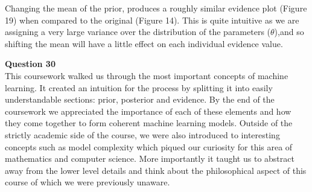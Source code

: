 \documentclass[10pt, a4paper, twocolumn]{article} %
\begin{document}
\begin{enumerate}
  Changing the mean of the prior, produces a roughly similar evidence plot (Figure 19) when compared to the original (Figure 14). This is quite intuitive as we are assigning a very large variance over the distribution of the parameters ($\theta$),and so shifting the mean will have a little effect on each individual evidence value.
  
  \textbf{Question 30}\\ This coursework walked us through the most important concepts of machine learning. It created an intuition for the process by splitting it into easily understandable sections: prior, posterior and evidence. By the end of the coursework we appreciated the importance of each of these elements and how they come together to form coherent machine learning models. Outside of the strictly academic side of the course, we were also introduced to interesting concepts such as model complexity which piqued our curiosity for this area of mathematics and computer science. More importantly it taught us to abstract away from the lower level details and think about the philosophical aspect of this course of which we were previously unaware.  
  
\end{enumerate}



{}

\nocite{*}


\end{document}

